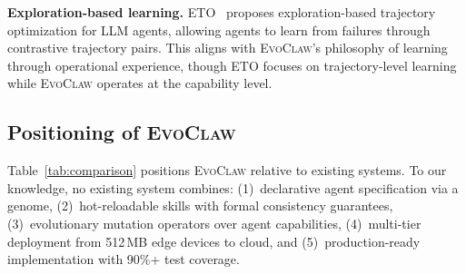 \documentclass{article}
\newcommand{\evoclaw}{\textsc{EvoClaw}}
\begin{document}
\textbf{Exploration-based learning.} ETO~\cite{song2024eto} proposes exploration-based trajectory optimization for LLM agents, allowing agents to learn from failures through contrastive trajectory pairs. This aligns with \evoclaw{}'s philosophy of learning through operational experience, though ETO focuses on trajectory-level learning while \evoclaw{} operates at the capability level.


\subsection{Positioning of \evoclaw{}}

Table~\ref{tab:comparison} positions \evoclaw{} relative to existing systems. To our knowledge, no existing system combines: (1)~declarative agent specification via a genome, (2)~hot-reloadable skills with formal consistency guarantees, (3)~evolutionary mutation operators over agent capabilities, (4)~multi-tier deployment from 512\,MB edge devices to cloud, and (5)~production-ready implementation with 90\%+ test coverage.
\end{document}

